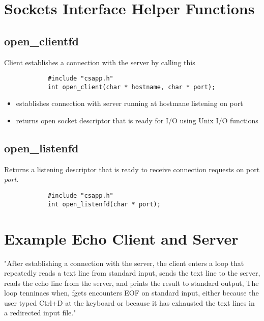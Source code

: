 \documentclass{article}
\author{Grant Cox}
\begin{document}
\section{Sockets Interface Helper Functions}
    \subsection{open\_clientfd}
        Client establishes a connection with the server by calling this

        \bigskip
        \begin{verbatim}
            #include "csapp.h"
            int open_client(char * hostname, char * port);
        \end{verbatim}
        
        \bigskip
        \begin{itemize}
            \item establishes connection with server running at hostmane listening on port
            \item returns open socket descriptor that is ready for I/O using Unix I/O functions
        \end{itemize}
        
    \subsection{open\_listenfd}
        Returns a listening descriptor that is ready to receive connection requests on port \textit{port}. 
        \bigskip
        \begin{verbatim}
            #include "csapp.h"
            int open_listenfd(char * port);
        \end{verbatim}
        
\section{Example Echo Client and Server}
    "After establishing a connection with the server, the client enters a loop that repeatedly reads a text line from standard input, sends the text line to the server, reads the echo line from the server, and prints the result to standard output, The loop tenninaes when, fgets encounters EOF on standard input, either because the user typed Ctrl+D at the keyboard or because it has exhausted the text lines in a redirected input file."

    
\end{document}

